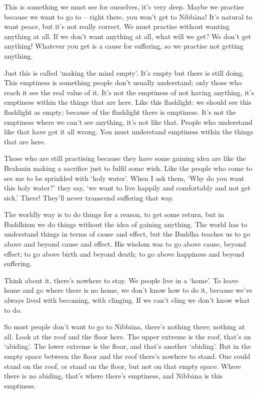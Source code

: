 This is something we must see for ourselves, it's very deep. Maybe we practise because we want to go to  -- right there, you won't get to Nibb\=ana! It's natural to want peace, but it's not really correct. We must practise without wanting anything at all. If we don't want anything at all, what will we get? We don't get anything! Whatever you get is a cause for suffering, so we practise not getting anything. 

Just this is called `making the mind empty'. It's empty but there is still doing. This emptiness is something people don't usually understand; only those who reach it see the real value of it. It's not the emptiness of not having anything, it's emptiness within the things that are here. Like this flashlight: we should see this flashlight as empty; because of the flashlight there is emptiness. It's not the emptiness where we can't see anything, it's not like that. People who understand like that have got it all wrong. You must understand emptiness within the things that are here. 

Those who are still practising because they have some gaining idea are like the Brahmin making a sacrifice just to fulfil some wish. Like the people who come to see me to be sprinkled with `holy water'. When I ask them, `Why do you want this holy water?' they say, `we want to live happily and comfortably and not get sick.' There! They'll never transcend suffering that way. 

The worldly way is to do things for a reason, to get some return, but in Buddhism we do things without the idea of gaining anything. The world has to understand things in terms of cause and effect, but the Buddha teaches us to go above and beyond cause and effect. His wisdom was to go above cause, beyond effect; to go above birth and beyond death; to go above happiness and beyond suffering. 

Think about it, there's nowhere to stay. We people live in a `home'. To leave home and go where there is no home, we don't know how to do it, because we've always lived with becoming, with clinging. If we can't cling we don't know what to do. 

So most people don't want to go to Nibb\=ana, there's nothing there; nothing at all. Look at the roof and the floor here. The upper extreme is the roof, that's an `abiding'. The lower extreme is the floor, and that's another `abiding'. But in the empty space between the floor and the roof there's nowhere to stand. One could stand on the roof, or stand on the floor, but not on that empty space. Where there is no abiding, that's where there's emptiness, and Nibb\=ana is this emptiness. 

